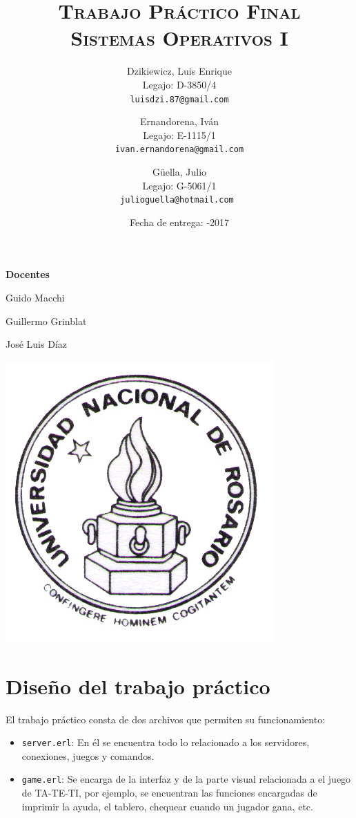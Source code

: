 \documentclass[a4paper]{article}
\author{
        Dzikiewicz, Luis Enrique\\
        Legajo: D-3850/4\\
        \texttt{luisdzi.87@gmail.com}
        \and Ernandorena, Iván\\
        Legajo: E-1115/1\\
        \texttt{ivan.ernandorena@gmail.com}
        \and Güella, Julio\\
        Legajo: G-5061/1\\
        \texttt{julioguella@hotmail.com }
}
\date{
    Fecha de entrega: -2017
}
\title {
    \Huge  \textsc{Trabajo Práctico Final\\}
    \large \textsc{Sistemas Operativos I}
}
\newcommand{\blacktr}[0]{\item[$\blacktriangleright$]}
\begin{document}

    \maketitle

    \thispagestyle{empty}

    \begin{center}
         \large \bf Docentes
    \end{center}

    \begin{center}
      Guido Macchi
      
      Guillermo Grinblat

      José Luis Díaz
        \vspace{2cm}

        \includegraphics[scale=1.5]{Logo-Unr}
    

    \end{center}


\newpage




\section*{Diseño del trabajo práctico}

El trabajo práctico consta de dos archivos que permiten su funcionamiento:
\begin{itemize}
  \blacktr \texttt{server.erl}: En él se encuentra todo lo relacionado a los servidores, conexiones, juegos y comandos.
  \blacktr \texttt{game.erl}: Se encarga de la interfaz y de la parte visual relacionada a el juego de TA-TE-TI, por ejemplo, se encuentran las funciones encargadas de imprimir la ayuda, el tablero, chequear cuando un jugador gana, etc. 
\end{itemize}
\end{document}
